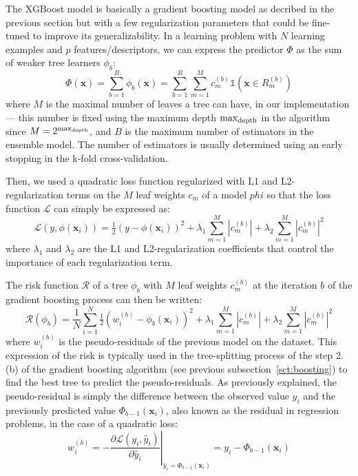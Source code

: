 \documentclass[main]{subfiles}
\begin{document}
The XGBoost model is basically a gradient boosting model as decribed in the previous section but with a few regularization parameters that could be fine-tuned to improve its generalizability. In a learning problem with $N$ learning examples and $p$ features/descriptors, we can express the predictor $\Phi$ as the sum of weaker tree learners $\phi_b$:
\begin{equation}
  \Phi(\mathbf{x}) = \sum_{b=1}^{B} \phi_b(\mathbf{x}) = \sum_{b=1}^{B} \sum_{m=1}^{M}c_m^{(b)} \mathbb{1}(\mathbf{x}\in R_m^{(b)})
\end{equation}
where $M$ is the maximal number of leaves a tree can have, in our implementation --- this number is fixed using the maximum depth $\max_{\text{depth}}$ in the algorithm since $M=2^{\max_{\text{depth}}}$, and $B$ is the maximum number of estimators in the ensemble model. The number of estimators is usually determined using an early stopping in the k-fold cross-validation. 

Then, we used a quadratic loss function regularized with L1 and L2-regularization terms on the $M$ leaf weights $c_m$ of a model $phi$ so that the loss function $\mathcal{L}$ can simply be expressed as: 
\begin{equation}
  \mathcal{L}\left(y,\phi(\mathbf{x}_i)\right) = \tfrac{1}{2}{\left(y - \phi(\mathbf{x}_i)\right)}^2 + \lambda_1 \sum_{m=1}^{M}\left\lvert{c_m^{(b)}}\right\rvert + \lambda_2 \sum_{m=1}^{M}{\left\lvert{c_m^{(b)}}\right\rvert}^2 
\end{equation}
where $\lambda_1$ and $\lambda_2$ are the L1 and L2-regularization coefficients that control the importance of each regularization term. 

The risk function $\mathcal{R}$ of a tree $\phi_b$ with $M$ leaf weights $c_m^{(b)}$ at the iteration $b$ of the gradient boosting process can then be written:
\begin{equation}
  \mathcal{R}(\phi_b) = \frac{1}{N}\sum_{i=1}^{N} \tfrac{1}{2}{\left(w_i^{(b)} - \phi_b(\mathbf{x}_i)\right)}^2 + \lambda_1 \sum_{m=1}^{M}\left\lvert{c_m^{(b)}}\right\rvert + \lambda_2 \sum_{m=1}^{M}{\left\lvert{c_m^{(b)}}\right\rvert}^2 
\end{equation}
where $w_i^{(b)}$ is the pseudo-residuals of the previous model on the dataset. This expression of the risk is typically used in the tree-splitting process of the step 2.(b) of the gradient boosting algorithm (see previous subsection~\ref{sct:boosting}) to find the best tree to predict the pseudo-residuals. As previously explained, the pseudo-residual is simply the difference between the observed value $y_i$ and the previously predicted value $\Phi_{b-1}(\mathbf{x}_i)$, also known as the residual in regression problems, in the case of a quadratic loss:
\begin{equation}
  w_i^{(b)} = -\left.\frac{\partial\mathcal{L}\left(y_i,\hat{y}_i\right)}{\partial\hat{y}_i}\right|_{\hat{y}_i=\Phi_{b-1}(\mathbf{x}_i)} = y_i - \Phi_{b-1}(\mathbf{x}_i)
\end{equation}
\end{document}
